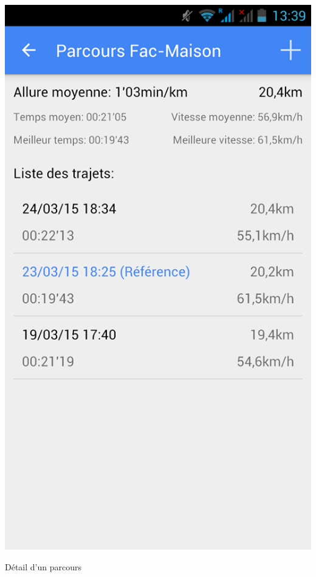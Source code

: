 \begin{multicols}{2}
\begin{img}
  \includegraphics[scale=0.35]{img/parcours.jpg}
  \caption{Détail d'un parcours}
  \label{détail Parcours}
\end{img}
\begin{img}

\end{img}
\end{multicols}
